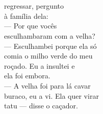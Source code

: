 \chapter*{}

\mbox{}\vspace*{\fill}



 regressar, pergunto\\
à família dela:\\
--- Por que vocês\\
esculhambaram com a velha?\\
--- Esculhambei porque ela só\\
comia o milho verde do meu\\
roçado. Eu a insultei e\\
ela foi embora.\\
--- A velha foi para lá cavar\\
buraco, eu a vi. Ela quer virar\\
tatu — disse o caçador.

